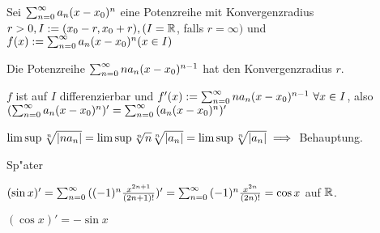 \documentclass[a4paper,twoside,DIV15,BCOR12mm]{scrbook}
\begin{document}
\begin{satz}
Sei $\sum_{n=0}^{\infty}{a_n(x-x_0)^n}$ eine Potenzreihe mit Konvergenzradius $r>0, I:=(x_0-r, x_0+r), (I=\mathbb{R}$, falls $r=\infty)$ und $f(x):=\sum_{n=0}^{\infty}{a_n(x-x_0)^n} (x \in I)$
\begin{liste}
\item Die Potenzreihe $\sum_{n=0}^{\infty}{na_n(x-x_0)^{n-1}}$ hat den Konvergenzradius $r$.
\item $f$ ist auf $I$ differenzierbar und $f'(x):=\sum_{n=0}^{\infty}{na_n(x-x_0)^{n-1}}\ \forall x \in I$, also $(\sum_{n=0}^{\infty}{a_n(x-x_0)^n})' = \sum_{n=0}^{\infty}{(a_n(x-x_0)^n)'}$
\end{liste}
\end{satz}

\begin{beweise}
\item $\limsup \sqrt[n]{|na_n|}=\limsup \sqrt[n]{n}\sqrt[n]{|a_n|}=\limsup \sqrt[n]{|a_n|} \implies$ Behauptung.
\item Sp"ater
\end{beweise}

\begin{beispiele}
\item $(\sin x)' = \sum_{n=0}^{\infty}{((-1)^n\frac{x^{2n+1}}{(2n+1)!}})'=\sum_{n=0}^{\infty}{(-1)^n\frac{x^{2n}}{(2n)!}}=\cos x$ auf $\mathbb{R}$.
\item $(\cos x)' = -\sin x$
\end{beispiele}
\end{document}
